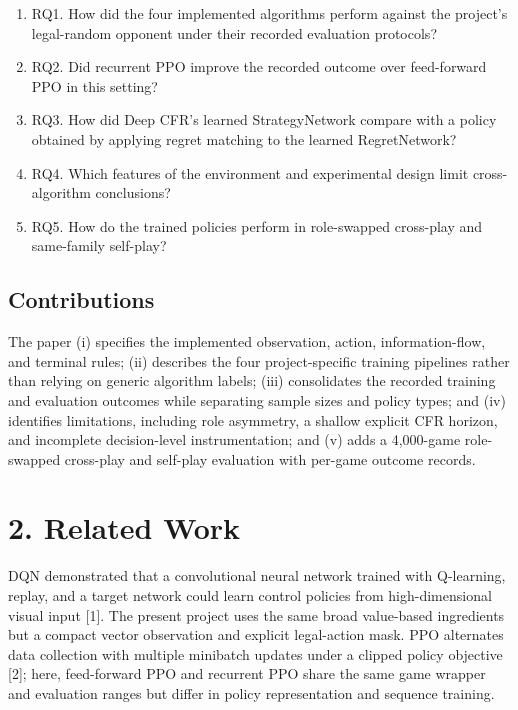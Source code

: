 \documentclass[11pt]{article}
\begin{document}
\begin{enumerate}[leftmargin=*,label=]

\item RQ1. How did the four implemented algorithms perform against the project's legal-random opponent under their recorded evaluation protocols?

\item RQ2. Did recurrent PPO improve the recorded outcome over feed-forward PPO in this setting?

\item RQ3. How did Deep CFR's learned StrategyNetwork compare with a policy obtained by applying regret matching to the learned RegretNetwork?

\item RQ4. Which features of the environment and experimental design limit cross-algorithm conclusions?

\item RQ5. How do the trained policies perform in role-swapped cross-play and same-family self-play?

\end{enumerate}

\subsection*{Contributions}

The paper (i) specifies the implemented observation, action, information-flow, and terminal rules; (ii) describes the four project-specific training pipelines rather than relying on generic algorithm labels; (iii) consolidates the recorded training and evaluation outcomes while separating sample sizes and policy types; and (iv) identifies limitations, including role asymmetry, a shallow explicit CFR horizon, and incomplete decision-level instrumentation; and (v) adds a 4,000-game role-swapped cross-play and self-play evaluation with per-game outcome records.

\section*{2. Related Work}

DQN demonstrated that a convolutional neural network trained with Q-learning, replay, and a target network could learn control policies from high-dimensional visual input [1]. The present project uses the same broad value-based ingredients but a compact vector observation and explicit legal-action mask. PPO alternates data collection with multiple minibatch updates under a clipped policy objective [2]; here, feed-forward PPO and recurrent PPO share the same game wrapper and evaluation ranges but differ in policy representation and sequence training.
\end{document}
